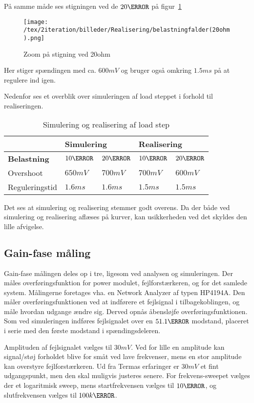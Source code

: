 På samme måde ses stigningen ved de $20\ohm$ på figur~\ref{fig:belastning_20ohm}
\begin{figure}[H]
	\center
	\texttt{[image: /tex/2iteration/billeder/Realisering/belastningfalder(20ohm).png]}
	\caption{Zoom på stigning ved 20ohm}
	\label{fig:belastning_20ohm}
\end{figure}
Her stiger spændingen med ca. $600mV$ og bruger også omkring $1.5ms$ på at regulere ind igen. 

Nedenfor ses et overblik over simuleringen af load steppet i forhold til realiseringen. 

\begin{table}[H] 			
	\centering
	\begin{tabularx}{\textwidth}{|X|l|l|l|l|}
		\hline
		& \multicolumn{2}{|l|}{\textbf{Simulering}} & \multicolumn{2}{|l|}{\textbf{Realisering}} \\ \hline
		\textbf{Belastning} & $10\ohm$ & $20\ohm$ & $10\ohm$ & $20\ohm$ \\ \hline
		Overshoot & $650mV$ & $700mV$ & $700mV$ & $600mV$  \\ \hline
		Reguleringstid & $1.6ms$ & $1.6ms$ & $1.5ms$ & $1.5ms$ \\ \hline
	\end{tabularx}
	\caption{Simulering og realisering af load step}
	\label{tab:Loadstep}
\end{table}
Det ses at simulering og realisering stemmer godt overens. Da der både ved simulering og realisering aflæses på kurver, kan usikkerheden ved det skyldes den lille afvigelse.

\subsection{Gain-fase måling} \label{gain_fase_2}
Gain-fase målingen deles op i tre, ligesom ved analysen og simuleringen. Der måles overføringsfunktion for power modulet, fejlforstærkeren, og for det samlede system. Målingerne foretages vha. en Network Analyzer af typen HP4194A. Den måler overføringsfunktionen ved at indførere et fejlsignal i tilbagekoblingen, og måle hvordan udgange ændre sig. Derved opnås åbensløjfe overføringsfunktionen. Som ved simuleringen indføres fejlsignalet over en $51.1\ohm$ modstand, placeret i serie med den første modstand i spændingsdeleren. 

Amplituden af fejlsignalet vælges til $30mV$. Ved for lille en amplitude kan signal/støj forholdet blive for småt ved lave frekvenser, mens en stor amplitude kan overstyre fejlforstærkeren. Ud fra Termas erfaringer er $30mV$ et fint udgangspunkt, men den skal muligvis justeres senere. For frekvens-sweepet vælges der et logaritmisk sweep, mens startfrekvensen vælges til $10\hertz$, og slutfrekvensen vælges til $100k\hertz$. 

